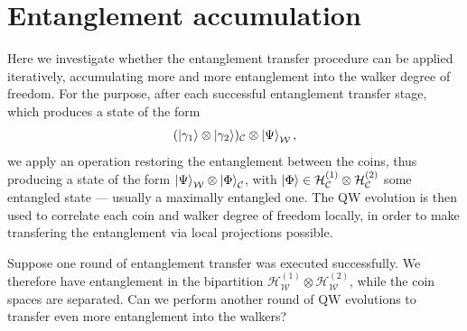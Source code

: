 \documentclass[
	aps, pra,
	superscriptaddress, twocolumn,
	floatfix,
	10pt
]{revtex4-1}
\newcommand{\parTitle}[1]{\noindent{\color{Mahogany}(\emph{#1})}}
\newcommand{\calC}{{\mathcal{C}}}
\newcommand{\calH}{{\mathcal{H}}}
\newcommand{\calW}{{\mathcal{W}}}
\newcommand{\HC}{\calH_\calC}
\newcommand{\HW}{\calH_\calW}
\renewcommand{\parTitle}[1]{}
\begin{document}
\section{Entanglement accumulation}
\label{sec:entanglement_accumulation}

\parTitle{Section overview}
Here we investigate whether the entanglement transfer procedure can be applied iteratively, accumulating more and more entanglement into the walker degree of freedom.
For the purpose, after each successful entanglement transfer stage, which produces a state of the form
\begin{equation}
	(\ket{\gamma_1}\otimes\ket{\gamma_2})_{\calC}\otimes \ket{\Psi}_{\calW},
\end{equation}
we apply an operation restoring the entanglement between the coins, thus producing a state of the form
	$\ket{\Psi}_{\calW}\otimes\ket{\Phi}_{\calC}$,
with $\ket{\Phi}\in\HC^{(1)}\otimes\HC^{(2)}$ some entangled state --- usually a maximally entangled one.
The QW evolution is then used to correlate each coin and walker degree of freedom locally, in order to make transfering the entanglement via local projections possible.

\parTitle{Output of single round of entanglement transfer}
Suppose one round of entanglement transfer was executed successfully.
We therefore have entanglement in the bipartition $\HW^{(1)}\otimes\HW^{(2)}$, while the coin spaces are separated.
Can we perform another round of QW evolutions to transfer even more entanglement into the walkers?
\end{document}
